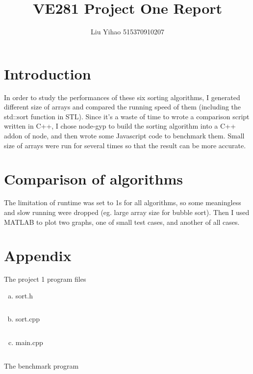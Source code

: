 \documentclass{article}
\title{VE281 Project One Report}
\author{Liu Yihao 515370910207}
\date{}
\begin{document}
\maketitle

\section{Introduction}

In order to study the performances of these six sorting algorithms, I generated different size of arrays and compared the running speed of them (including the std::sort function in STL). Since it's a waste of time to wrote a comparison script written in C++, I chose node-gyp to build the sorting algorithm into a C++ addon of node, and then wrote some Javascript code to benchmark them. Small size of arrays were run for several times so that the result can be more accurate.

\section{Comparison of algorithms}

The limitation of runtime was set to 1s for all algorithms, so some meaningless and slow running were dropped (eg. large array size for bubble sort). Then I used MATLAB to plot two graphs, one of small test cases, and another of all cases.

\begin{figure}
\end{figure}


\section{Appendix}

The project 1 program files
\begin{enumerate}[(a)]
\item
sort.h
\inputminted{c++}{../answer/sort.h}
\item
sort.cpp
\inputminted{c++}{../answer/sort.cpp}
\item
main.cpp
\inputminted{c++}{../answer/main.cpp}
\end{enumerate}

The benchmark program
\inputminted{javascript}{../benchmark/benchmark.js}
\end{document}
